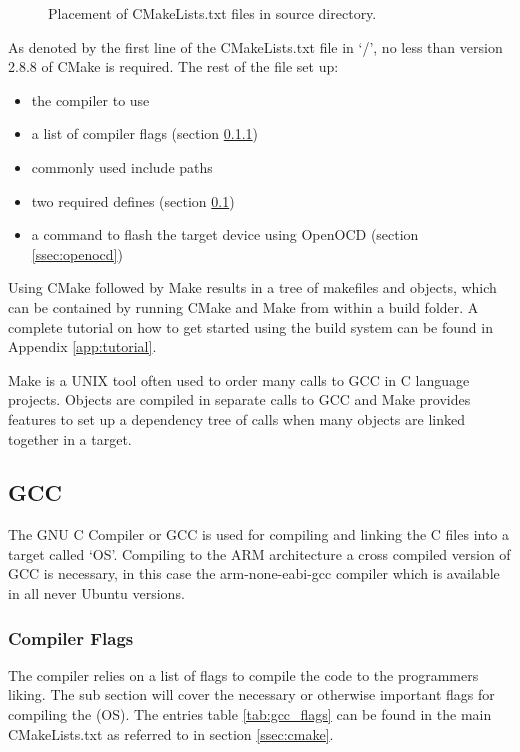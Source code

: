 \begin{figure}[H]
	\caption{Placement of CMakeLists.txt files in source directory.}
	\label{fig:cmake_files}
\end{figure}

As denoted by the first line of the CMakeLists.txt file in `/', no less than version 2.8.8 of CMake is required.
The rest of the file set up:

\begin{itemize}
	\item the compiler to use
	\item a list of compiler flags (section \ref{sssec:compiler_flags})
	\item commonly used include paths
	\item two required defines (section \ref{ssec:gcc})
	\item a command to flash the target device using OpenOCD (section \ref{ssec:openocd})
\end{itemize}

Using CMake followed by Make results in a tree of makefiles and objects,
which can be contained by running CMake and Make from within a build folder.
A complete tutorial on how to get started using the build system can be found in Appendix \ref{app:tutorial}.

Make is a UNIX tool\cite{gnu_make} often used to order many calls to GCC in C language projects.
Objects are compiled in separate calls to GCC and
Make provides features to set up a dependency tree of calls when many objects are linked together in a target.

\subsection{GCC}
\label{ssec:gcc}
The GNU C Compiler or GCC is used for compiling and linking the C files into a target called `OS'.
Compiling to the ARM architecture a cross compiled version of GCC is necessary,
in this case the arm-none-eabi-gcc compiler which is available in all never Ubuntu versions\cite{arm_gcc}.

\subsubsection{Compiler Flags}
\label{sssec:compiler_flags}
The compiler relies on a list of flags to compile the code to the programmers liking.
The sub section will cover the necessary or otherwise important flags for compiling the (OS).
The entries table \ref{tab:gcc_flags} can be found in the main CMakeLists.txt as referred to in section \ref{ssec:cmake}.

